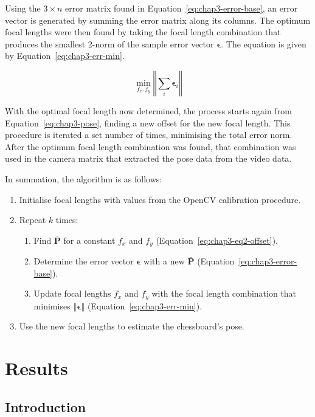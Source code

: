 Using the $3\times n$ error matrix found in Equation~\ref{eq:chap3-error-base}, an error vector is generated by summing the error matrix along its columns. The optimum focal lengths were then found by taking the focal length combination that produces the smallest 2-norm of the sample error vector $\bm{\epsilon}$. The equation is given by Equation~\ref{eq:chap3-err-min}.

\begin{equation}
  \label{eq:chap3-err-min}
  \min_{f_x, f_y}\left \Vert \sum_i  \bm{\epsilon}_i \right \Vert
\end{equation}

With the optimal focal length now determined, the process starts again from Equation~\ref{eq:chap3-pose}, finding a new offset for the new focal length. This procedure is iterated a set number of times, minimising the total error norm. After the optimum focal length combination was found, that combination was used in the camera matrix that extracted the pose data from the video data.

In summation, the algorithm is as follows:

\begin{enumerate}
  \item Initialise focal lengths with values from the OpenCV calibration procedure. 
  \item Repeat $k$ times:
  \begin{enumerate}
    \item Find $\bar{\bm{P}}$ for a constant $f_x$ and $f_y$ (Equation~\ref{eq:chap3-eq2-offset}).
    \item Determine the error vector $\bm{\epsilon}$ with a new $\bar{\bm{P}}$ (Equation~\ref{eq:chap3-error-base}).
    \item Update focal lengths $f_x$ and $f_y$ with the focal length combination that minimises $\left \Vert \bm{\epsilon} \right \Vert$ (Equation~\ref{eq:chap3-err-min}).
  \end{enumerate}
  \item Use the new focal lengths to estimate the chessboard's pose.
\end{enumerate}

\section{Results}

\subsection{Introduction}

